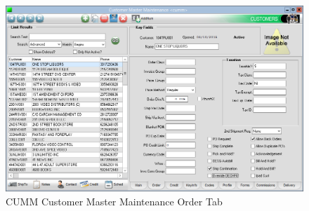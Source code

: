 \begin{enumerate}
	\begin{figure}[H]
		\includegraphics[width=\textwidth]{../img/image76}
		\caption{CUMM Customer Master Maintenance Order Tab}
	\end{figure}
	

\end{enumerate}
